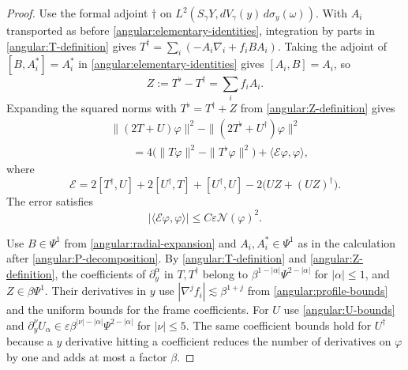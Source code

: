 \documentclass[11pt,a4paper]{article}
\theoremstyle{definition}
\theoremstyle{remark}
\newcommand{\eps}{\varepsilon}
\numberwithin{equation}{section}
\begin{document}
\begin{proof}
Use the formal adjoint $\dagger$ on
$L^2(S_\gamma Y,dV_\gamma(y)\,d\sigma_y(\omega))$.
With $A_i$ transported as before \eqref{angular:elementary-identities},
integration by parts in \eqref{angular:T-definition} gives
$T^\dagger=\sum_i(-A_i\nabla_i+f_i BA_i)$.
Taking the adjoint of $[B,A_i^*]=A_i^*$ in
\eqref{angular:elementary-identities} gives $[A_i,B]=A_i$, so
\begin{equation}\label{angular:Z-definition}
 Z:=T^\flat-T^\dagger=\sum_i f_iA_i.
\end{equation}
Expanding the squared norms with $T^\flat=T^\dagger+Z$ from
\eqref{angular:Z-definition} gives
\begin{equation}\label{angular:norm-comparison}
 \begin{split}
 &\|(2T+U)\varphi\|^2-
                \|(2T^\flat+U^\dagger)\varphi\|^2\\
 &\qquad=4\bigl(\|T\varphi\|^2-\|T^\flat\varphi\|^2\bigr)
                       +\langle\mathcal E\varphi,\varphi\rangle,
 \end{split}
\end{equation}
where
\begin{equation}\label{angular:error-operator}
 \mathcal E=2[T^\dagger,U]+2[U^\dagger,T]+[U^\dagger,U]
                       -2\bigl(UZ+(UZ)^\dagger\bigr).
\end{equation}
The error satisfies
\begin{equation}\label{angular:error-form-bound}
 |\langle\mathcal E\varphi,\varphi\rangle|
                         \le C\eps\mathcal N(\varphi)^2.
\end{equation}

Use $B\in\Psi^1$ from \eqref{angular:radial-expansion} and
$A_i,A_i^*\in\Psi^1$ as in the calculation after
\eqref{angular:P-decomposition}. By \eqref{angular:T-definition}
and \eqref{angular:Z-definition}, the coefficients of
$\partial_y^\alpha$ in $T,T^\dagger$ belong to
$\beta^{1-|\alpha|}\Psi^{2-|\alpha|}$ for $|\alpha|\le1$, and
$Z\in\beta\Psi^1$. Their derivatives in $y$ use
$|\nabla^j f_i|\lesssim\beta^{1+j}$ from \eqref{angular:profile-bounds}
and the uniform bounds for the frame coefficients. For $U$ use \eqref{angular:U-bounds} and
$\partial_y^\nu U_\alpha\in
\eps\beta^{|\nu|-|\alpha|}\Psi^{2-|\alpha|}$ for $|\nu|\le5$.
The same coefficient bounds hold for $U^\dagger$ because a $y$
derivative hitting a coefficient reduces the number of derivatives
on $\varphi$ by one and adds at most a factor $\beta$.


\end{proof}
\end{document}
